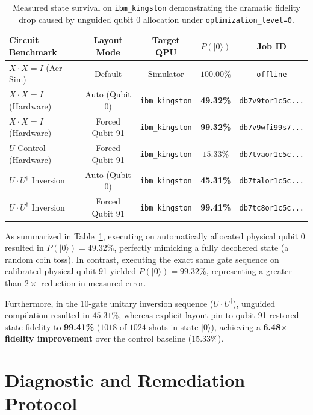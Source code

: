 \documentclass[10pt,twocolumn]{article}
\begin{document}
\begin{table}[htbp]
\centering
\small
\begin{tabular}{lcccc}
\toprule
\textbf{Circuit Benchmark} & \textbf{Layout Mode} & \textbf{Target QPU} & \textbf{$P(|0\rangle)$} & \textbf{Job ID} \\
\midrule
$X \cdot X = I$ (Aer Sim) & Default & Simulator & $100.00\%$ & \texttt{offline} \\
$X \cdot X = I$ (Hardware) & Auto (Qubit 0) & \texttt{ibm\_kingston} & \textbf{49.32\%} & \texttt{db7v9tor1c5c...} \\
$X \cdot X = I$ (Hardware) & Forced Qubit 91 & \texttt{ibm\_kingston} & \textbf{99.32\%} & \texttt{db7v9wfi99s7...} \\
\midrule
$U$ Control (Hardware) & Forced Qubit 91 & \texttt{ibm\_kingston} & $15.33\%$ & \texttt{db7tvaor1c5c...} \\
$U \cdot U^{\dagger}$ Inversion & Auto (Qubit 0) & \texttt{ibm\_kingston} & \textbf{45.31\%} & \texttt{db7talor1c5c...} \\
$U \cdot U^{\dagger}$ Inversion & Forced Qubit 91 & \texttt{ibm\_kingston} & \textbf{99.41\%} & \texttt{db7tc8or1c5c...} \\
\bottomrule
\end{tabular}
\caption{Measured state survival on \texttt{ibm\_kingston} demonstrating the dramatic fidelity drop caused by unguided qubit 0 allocation under \texttt{optimization\_level=0}.}
\label{tab:heron_benchmarks}
\end{table}

As summarized in Table~\ref{tab:heron_benchmarks}, executing on automatically allocated physical qubit 0 resulted in $P(|0\rangle) = 49.32\%$, perfectly mimicking a fully decohered state (a random coin toss). In contrast, executing the exact same gate sequence on calibrated physical qubit 91 yielded $P(|0\rangle) = 99.32\%$, representing a greater than $2\times$ reduction in measured error.

Furthermore, in the 10-gate unitary inversion sequence ($U \cdot U^{\dagger}$), unguided compilation resulted in $45.31\%$, whereas explicit layout pin to qubit 91 restored state fidelity to \textbf{99.41\%} ($1018$ of $1024$ shots in state $|0\rangle$), achieving a \textbf{6.48$\times$ fidelity improvement} over the control baseline ($15.33\%$).

\section{Diagnostic and Remediation Protocol}
\end{document}
